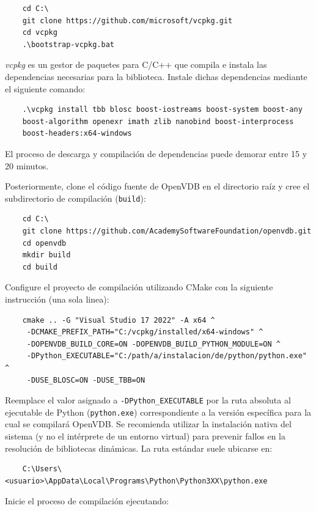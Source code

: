 \begin{verbatim}
    cd C:\
    git clone https://github.com/microsoft/vcpkg.git
    cd vcpkg
    .\bootstrap-vcpkg.bat
\end{verbatim}

\textit{vcpkg} es un gestor de paquetes para C/C++ que compila e instala las dependencias 
necesarias para la biblioteca. Instale dichas dependencias mediante el siguiente comando:

\begin{verbatim}
    .\vcpkg install tbb blosc boost-iostreams boost-system boost-any 
    boost-algorithm openexr imath zlib nanobind boost-interprocess 
    boost-headers:x64-windows
\end{verbatim}
El proceso de descarga y compilación de dependencias puede demorar entre 15 y 20 minutos.
\medskip

Posteriormente, clone el código fuente de OpenVDB en el directorio raíz y cree el subdirectorio 
de compilación (\texttt{build}):

\begin{verbatim}
    cd C:\
    git clone https://github.com/AcademySoftwareFoundation/openvdb.git
    cd openvdb
    mkdir build
    cd build
\end{verbatim}

Configure el proyecto de compilación utilizando CMake con la siguiente instrucción (una sola linea):

\begin{verbatim}
    cmake .. -G "Visual Studio 17 2022" -A x64 ^
     -DCMAKE_PREFIX_PATH="C:/vcpkg/installed/x64-windows" ^
     -DOPENVDB_BUILD_CORE=ON -DOPENVDB_BUILD_PYTHON_MODULE=ON ^
     -DPython_EXECUTABLE="C:/path/a/instalacion/de/python/python.exe" ^
     -DUSE_BLOSC=ON -DUSE_TBB=ON
\end{verbatim}
Reemplace el valor asignado a \texttt{-DPython\_EXECUTABLE} por la ruta absoluta al ejecutable 
de Python (\texttt{python.exe}) correspondiente a la versión específica para la cual se 
compilará OpenVDB. Se recomienda utilizar la instalación nativa del sistema 
(y no el intérprete de un entorno virtual) para prevenir fallos en la resolución de bibliotecas 
dinámicas. La ruta estándar suele ubicarse en:

\begin{verbatim}
    C:\Users\<usuario>\AppData\Local\Programs\Python\Python3XX\python.exe
\end{verbatim}

Inicie el proceso de compilación ejecutando:

